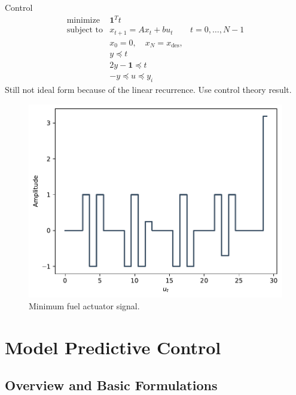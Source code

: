 \begin{chapter}{Control}
    \[\begin{array}{lll}
        \text{minimize} \; & \bm{1}^T t & \\
        \text{subject to} & x_{t+1} = Ax_t + bu_t \; & t=0, \ldots, N-1 \\
        & x_0 = 0, \quad x_{N} = x_{\text{des}}, & \\
        & y \preceq t & \\
        & 2y - \bm{1} \preceq t & \\
        & -y \preceq u \preceq y_i & 
        \end{array}\]
    Still not ideal form because of the linear recurrence. Use control theory result.
    
    \begin{figure}[h]
        \centering
        \includegraphics[width=\linewidth]{examples/cvx-ch4/4-16_min-fuel.pdf}
        \caption{Minimum fuel actuator signal.}
        \label{fig:4-16_min-fuel}
    \end{figure}
    
    \vspace*{.5cm}

    \section{Model Predictive Control}


    \subsection{Overview and Basic Formulations}


\end{chapter}
